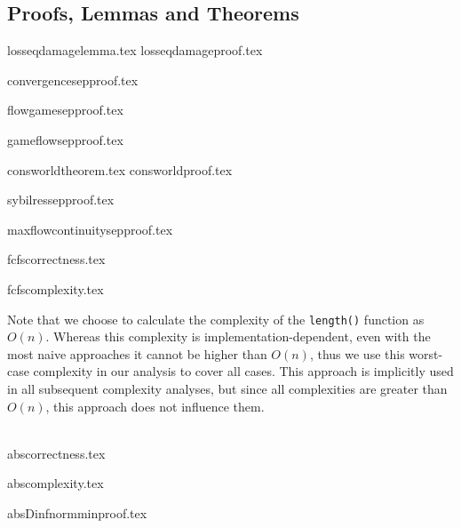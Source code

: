 \subsection{Proofs, Lemmas and Theorems}
{losseqdamagelemma.tex}
{losseqdamageproof.tex}

{convergencesepproof.tex}

{flowgamesepproof.tex}

{gameflowsepproof.tex}

{consworldtheorem.tex}
{consworldproof.tex}

{sybilressepproof.tex}

{maxflowcontinuitysepproof.tex}

{fcfscorrectness.tex}

{fcfscomplexity.tex}

Note that we choose to calculate the complexity of the \texttt{length()} function as $O\left(n\right)$. Whereas this
complexity is implementation-dependent, even with the most naive approaches it cannot be higher than $O\left(n\right)$,
thus we use this worst-case complexity in our analysis to cover all cases. This approach is implicitly used in all
subsequent complexity analyses, but since all complexities are greater than $O\left(n\right)$, this approach does not
influence them.

\ \\

{abscorrectness.tex}

{abscomplexity.tex}

{absDinfnormminproof.tex}
